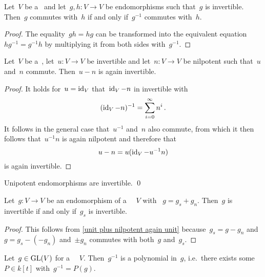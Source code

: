 \begin{lemma}
  Let~$V$ be a~{\kvs} and let~$g, h \colon V \to V$ be endomorphisms such that~$g$ is invertible.
  Then~$g$ commutes with~$h$ if and only if~$g^{-1}$ commutes with~$h$.
\end{lemma}


\begin{proof}
  The equality~$g h = h g$ can be transformed into the equivalent equation~$h g^{-1} = g^{-1} h$ by multiplying it from both sides with~$g^{-1}$.
\end{proof}


\begin{lemma}
  \label{unit plus nilpotent again unit}
  Let~$V$ be a~{\kvs}, let~$u \colon V \to V$ be invertible and let~$n \colon V \to V$ be nilpotent such that~$u$ and~$n$ commute.
  Then~$u - n$ is again invertible.
\end{lemma}


\begin{proof}
  It holds for~$u = \operatorname{id}_V$ that~$\operatorname{id}_V - n$ in invertible with
  \[
      (\operatorname{id}_V - n)^{-1}
    = \sum_{i=0}^\infty n^i \,.
  \]
  It follows in the general case that~$u^{-1}$ and~$n$ also commute, from which it then follows that~$u^{-1} n$ is again nilpotent and therefore that
  \[
      u - n
    = u (\operatorname{id}_V - u^{-1} n)
  \]
  is again invertible.
\end{proof}


\begin{corollary}
  Unipotent endomorphisms are invertible.
  \qed
\end{corollary}


\begin{corollary}
  \label{invertible iff ss part fd}
  Let~$g \colon V \to V$ be an endomorphism of a {\fd}~{\kvs}~$V$ with {\JCD}~$g = g_s + g_n$.
  Then~$g$ is invertible if and only if~$g_s$ is invertible.
\end{corollary}


\begin{proof}
  This follows from \cref{unit plus nilpotent again unit} because~$g_s = g - g_n$ and~$g = g_s - (-g_n)$ and~$\pm g_n$ commutes with both~$g$ and~$g_s$.
\end{proof}


\begin{lemma}
  Let~$g \in \operatorname{GL}(V)$ for a {\fd}~{\kvs}~$V$.
  Then~$g^{-1}$ is a polynomial in~$g$, i.e.\ there exists some~$P \in k[t]$ with~$g^{-1} = P(g)$.
\end{lemma}


